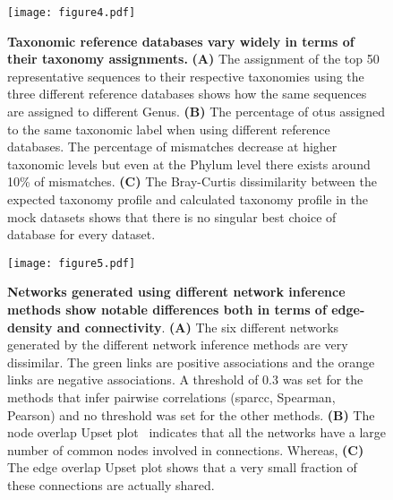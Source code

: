   \begin{figure}[H]
    \centering
    \texttt{[image: figure4.pdf]}
  \end{figure}
  \begin{figure}[H]
    \centering
    \caption{
      \textbf{Taxonomic reference databases vary widely in terms of their taxonomy assignments.}
      \textbf{(A)} The assignment of the top 50 representative sequences to their respective taxonomies using the three different reference databases shows how the same sequences are assigned to different Genus.
      \textbf{(B)} The percentage of \ac{otu}s assigned to the same taxonomic label when using different reference databases.
      The percentage of mismatches decrease at higher taxonomic levels but even at the Phylum level there exists around 10\% of mismatches.
      \textbf{(C)} The Bray-Curtis dissimilarity between the expected taxonomy profile and calculated taxonomy profile in the mock datasets shows that there is no singular best choice of database for every dataset.
    }
    \label{fig:figure4}
  \end{figure}
  \FloatBarrier
  \newpage


  \begin{figure}[H]
    \centering
    \texttt{[image: figure5.pdf]}
  \end{figure}
  \begin{figure}[H]
    \centering
    \caption{
      \textbf{Networks generated using different network inference methods show notable differences both in terms of edge-density and connectivity}.
      \textbf{(A)} The six different networks generated by the different network inference methods are very dissimilar.
      The green links are positive associations and the orange links are negative associations.
      A threshold of 0.3 was set for the methods that infer pairwise correlations (\ac{sparcc}, Spearman, Pearson) and no threshold was set for the other methods.
      \textbf{(B)} The node overlap Upset plot~\cite{Lex} indicates that all the networks have a large number of common nodes involved in connections.
      Whereas, \textbf{(C)} The edge overlap Upset plot shows that a very small fraction of these connections are actually shared.
    }
    \label{fig:figure5}
  \end{figure}
  \FloatBarrier
  \newpage

